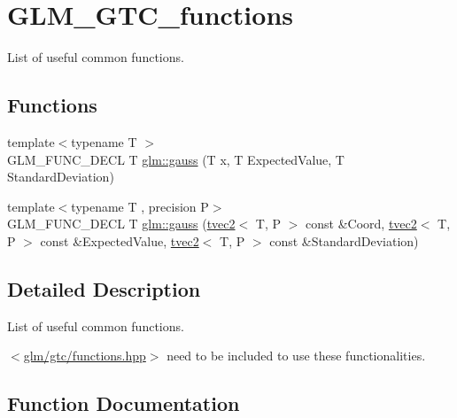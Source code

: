 \hypertarget{group__gtc__functions}{}\section{G\+L\+M\+\_\+\+G\+T\+C\+\_\+functions}
\label{group__gtc__functions}


List of useful common functions.  


\subsection*{Functions}
\begin{DoxyCompactItemize}
\item 
{\footnotesize template$<$typename T $>$ }\\G\+L\+M\+\_\+\+F\+U\+N\+C\+\_\+\+D\+E\+CL T \hyperlink{group__gtc__functions_ga0b50b197ff74261a0fad90f4b8d24702}{glm\+::gauss} (T x, T Expected\+Value, T Standard\+Deviation)
\item 
{\footnotesize template$<$typename T , precision P$>$ }\\G\+L\+M\+\_\+\+F\+U\+N\+C\+\_\+\+D\+E\+CL T \hyperlink{group__gtc__functions_ga7448f9eb74bb5924f6330ab532f2899c}{glm\+::gauss} (\hyperlink{structglm_1_1tvec2}{tvec2}$<$ T, P $>$ const \&Coord, \hyperlink{structglm_1_1tvec2}{tvec2}$<$ T, P $>$ const \&Expected\+Value, \hyperlink{structglm_1_1tvec2}{tvec2}$<$ T, P $>$ const \&Standard\+Deviation)
\end{DoxyCompactItemize}


\subsection{Detailed Description}
List of useful common functions. 

$<$\hyperlink{functions_8hpp}{glm/gtc/functions.\+hpp}$>$ need to be included to use these functionalities. 

\subsection{Function Documentation}
\mbox{\label{group__gtc__functions_ga0b50b197ff74261a0fad90f4b8d24702}} 
